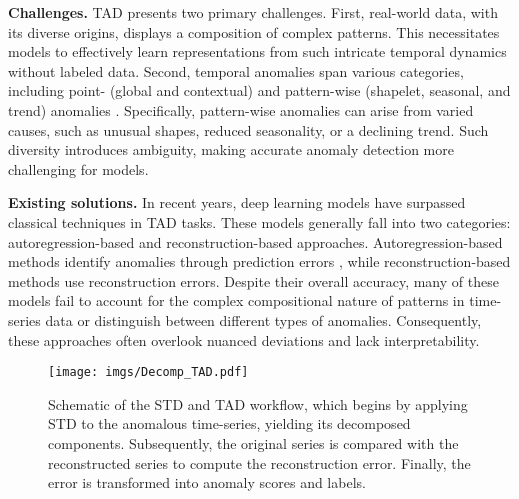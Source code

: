 \documentclass{article}
\begin{document}
\textbf{Challenges.} 
TAD presents two primary challenges. First, real-world data, with its diverse origins, displays a composition of complex patterns. This necessitates models to effectively learn representations from such intricate temporal dynamics without labeled data. Second, temporal anomalies span various categories, including point- (global and contextual) and pattern-wise (shapelet, seasonal, and trend) anomalies \cite{lai2021revisiting, xu2021anomaly}. Specifically, pattern-wise anomalies can arise from varied causes, such as unusual shapes, reduced seasonality, or a declining trend. Such diversity introduces ambiguity, making accurate anomaly detection more challenging for models.

\textbf{Existing solutions.}
In recent years, deep learning models \cite{tuli2022tranad, xu2021anomaly} have surpassed classical techniques \cite{scholkopf2001estimating} in TAD tasks. These models generally fall into two categories: autoregression-based and reconstruction-based approaches. Autoregression-based methods identify anomalies through prediction errors \cite{hundman2018detecting}, while reconstruction-based methods \cite{su2019robust, li2021multivariate} use reconstruction errors. Despite their overall accuracy, many of these models fail to account for the complex compositional nature of patterns in time-series data or distinguish between different types of anomalies. Consequently, these approaches often overlook nuanced deviations and lack interpretability.

\begin{figure}[t]
\centering
\texttt{[image: imgs/Decomp\_TAD.pdf]}
\caption{Schematic of the STD and TAD workflow, which begins by applying STD to the anomalous time-series, yielding its decomposed components. Subsequently, the original series is compared with the reconstructed series to compute the reconstruction error. Finally, the error is transformed into anomaly scores and labels.}
\label{fig:decomp_vis}
\vspace{-15pt}
\end{figure}
\end{document}
